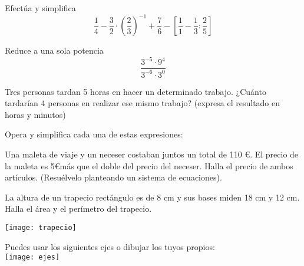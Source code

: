 \documentclass[addpoints,spanish, 12pt,a4paper]{exam}
\begin{document}
\begin{questions}

\question[1] Efectúa y simplifica  \[\frac{1}{4}-\frac{3}{2}\cdot\left(\frac{2}{3}\right)^{-1}+\frac{7}{6}-\left[\frac{1}{1}-\frac{1}{3}:\frac{2}{5}\right]\]
\addpoints

\question[1] Reduce a una sola potencia  \[\frac{3^{-5}\cdot9^{4}}{3^{-6}\cdot3^{0}}\]
\addpoints

\question[1] Tres personas tardan 5 horas en hacer un determinado trabajo. ¿Cuánto tardarían 4 personas en realizar ese mismo trabajo? (expresa el resultado en horas y minutos)
\addpoints

\question[2] Opera y simplifica cada una de estas expresiones:
\noaddpoints %
\addpoints


\question[2] Una maleta de viaje y un neceser costaban juntos un total de 110 \euro . El precio de la maleta es 5\euro \space más que el doble del precio del neceser. Halla el precio de ambos artículos. (Resuélvelo planteando un sistema de ecuaciones).
\addpoints

\question[1] La altura de un trapecio rectángulo es de 8 cm y sus bases miden 18 cm y 12 cm. Halla el área y el perímetro del trapecio.

\begin{center}
\texttt{[image: trapecio]}
\end{center}
    
\addpoints

\question[2] Puedes usar los siguientes ejes o dibujar los tuyos propios:\\
    \texttt{[image: ejes]}

\noaddpoints %
\end{questions}
\end{document}

